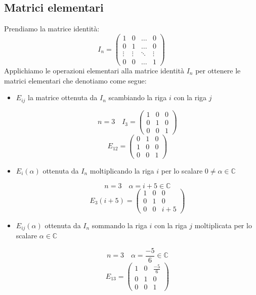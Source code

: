 \documentclass[a4paper]{article}
\theoremstyle{break}
\theoremstyle{break}
\theoremstyle{break}
\theoremstyle{break}
\begin{document}
\subsection{Matrici elementari}
Prendiamo la matrice identità:
\[
  I_n = \begin{pmatrix} 
    1 & 0 & \ldots & 0\\
    0 & 1 & \ldots & 0\\
    \vdots & \vdots & \ddots & \vdots\\
    0 & 0 & \ldots & 1
  \end{pmatrix}
\] 
Applichiamo le operazioni elementari alla matrice identità \( I_n \) per ottenere le
matrici elementari che denotiamo come segue:
\begin{itemize}
  \item 
    \(E_{ij}\) la matrice ottenuta da \( I_n \) scambiando la riga \( i \)
    con la riga \( j \) 
    \begin{example}
      \[
        n = 3 \quad I_3 = \begin{pmatrix} 
          1 & 0 & 0\\
          0 & 1 & 0\\
          0 & 0 & 1
        \end{pmatrix}
      \] 
      \[
        E_{12} = \begin{pmatrix} 
          0 & 1 & 0\\
          1 & 0 & 0\\
          0 & 0 & 1
        \end{pmatrix}
      \] 
    \end{example}
  \item \( E_i(\alpha) \) ottenuta da \( I_n \) moltiplicando la riga \( i \) per lo 
    scalare \( 0 \neq \alpha \in \mathbb{C} \) 
    \begin{example}
      \[
        n = 3 \quad \alpha = i + 5 \in \mathbb{C}
      \] 
      \[
        E_3(i+5) = \begin{pmatrix} 
          1 & 0 & 0\\
          0 & 1 & 0\\
          0 & 0 & i+5 
        \end{pmatrix}
      \] 
    \end{example}

  \item \( E_{ij}(\alpha) \) ottenuta da \( I_n \) sommando la riga \( i \) con la 
    riga \( j \) moltiplicata per lo scalare \( \alpha \in \mathbb{C} \) 
    \begin{example}
      \[
        n = 3 \quad \alpha = \frac{-5}{6} \in \mathbb{C}
      \] 
      \[
        E_{13} = \begin{pmatrix} 
          1 & 0 & \frac{-5}{6}\\
          0 & 1 & 0\\
          0 & 0 & 1
        \end{pmatrix}
      \] 
    \end{example}
\end{itemize}
\end{document}
